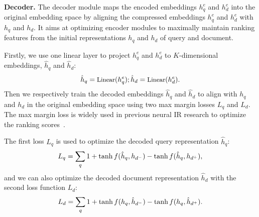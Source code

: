 \documentclass[11pt]{article}
\begin{document}
\textbf{Decoder.} The decoder module maps the encoded embeddings $h_q^e$ and $h_d^e$ into the original embedding space by aligning the compressed embeddings $h_q^e$ and $h_d^e$ with $h_q$ and $h_d$. It aims at optimizing encoder modules to maximally maintain ranking features from the initial representations $h_q$ and $h_d$ of query and document. 

Firstly, we use one linear layer to project $h_q^e$ and $h_d^e$ to $K$-dimensional embeddings, $\hat{h}_q$ and $\hat{h}_d$:
\begin{equation}\small
     \hat{h}_q = \text{Linear}(h_q^e);
     \hat{h}_d = \text{Linear}(h_d^e).
\end{equation}
Then we respectively train the decoded embeddings $\hat{h}_q$ and $\hat{h}_d$ to align with $h_q$ and $h_d$ in the original embedding space using two max margin losses $L_{q}$ and $L_{d}$. The max margin loss is widely used in previous neural IR research to optimize the ranking scores~\cite{xiong2017knrm,convknrm}.

The first loss $L_{q}$ is used to optimize the decoded query representation $\hat{h}_{q}$:
\begin{equation}\small
        L_{q}= \sum\limits_{q}{1 + \tanh f(\hat{h}_{q}, h_{d^-}) - \tanh f(\hat{h}_{q}, h_{d^+})},
\end{equation}
and we can also optimize the decoded document representation $\hat{h}_{d}$ with the second loss function $L_{d}$:
\begin{equation}\small
        L_{d}= \sum\limits_{q}{1 + \tanh  f(h_{q}, \hat{h}_{d^-}) - \tanh f(h_{q}, \hat{h}_{d^+})}.
\end{equation}
\end{document}
